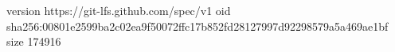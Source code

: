 version https://git-lfs.github.com/spec/v1
oid sha256:00801e2599ba2c02ea9f50072ffc17b852fd28127997d92298579a5a469ae1bf
size 174916
